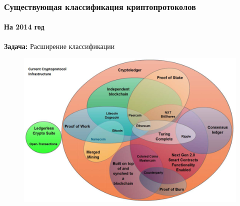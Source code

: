 \documentclass{beamer}
\begin{document}
\begin{frame}
    \frametitle{Существующая классификация криптопротоколов}
    \framesubtitle{На 2014 год}
    \textbf{Задача: } Расширение классификации

    \begin{figure}
        \includegraphics[width=0.85\columnwidth]{current_protocols.png}
        \captionsetup{labelformat=empty}
    \end{figure}
\end{frame}
\end{document}
